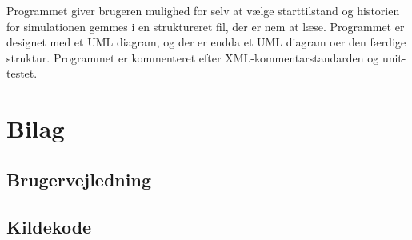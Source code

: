 \documentclass[a4paper]{article}
\begin{document}
    Programmet giver brugeren mulighed for selv at vælge starttilstand og 
    historien for simulationen gemmes i en struktureret fil, der er nem at læse.
    Programmet er designet med et UML diagram, og der er endda et UML diagram oer den færdige struktur.
    Programmet er kommenteret efter XML-kommentarstandarden og unit-testet.

  \section{Bilag}
     
      \subsection{Brugervejledning} \label{ssec:manual}
        
      \subsection{Kildekode} \label{ssec:sourceCode}
        
        
        
\end{document}
